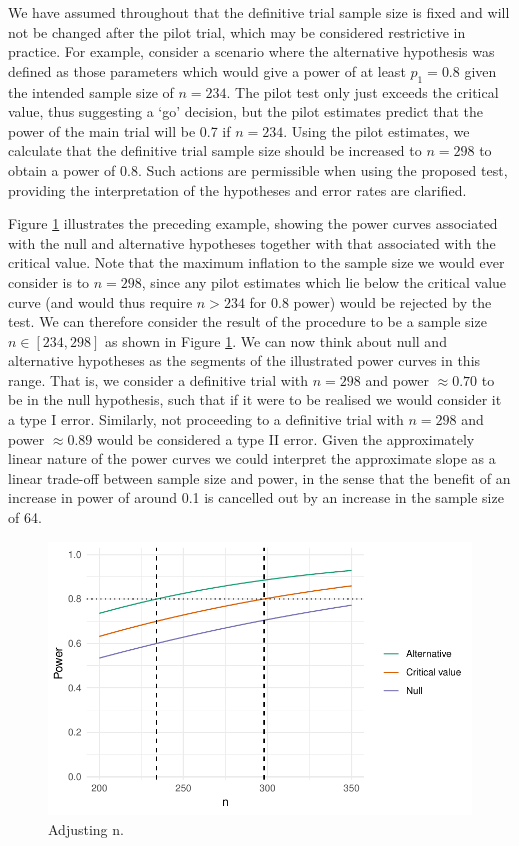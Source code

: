 \documentclass[AMA,STIX1COL]{WileyNJD-v2}
\begin{document}
We have assumed throughout that the definitive trial sample size is fixed and will not be changed after the pilot trial, which may be considered restrictive in practice. For example, consider a scenario where the alternative hypothesis was defined as those parameters which would give a power of at least $p_1 = 0.8$ given the intended sample size of $n = 234$. The pilot test only just exceeds the critical value, thus suggesting a `go' decision, but the pilot estimates predict that the power of the main trial will be 0.7 if $n = 234$. Using the pilot estimates, we calculate that the definitive trial sample size should be increased to $n = 298$ to obtain a power of 0.8. Such actions are permissible when using the proposed test, providing the interpretation of the hypotheses and error rates are clarified. 

Figure \ref{fig:adjust_n} illustrates the preceding example, showing the power curves associated with the null and alternative hypotheses together with that associated with the critical value. Note that the maximum inflation to the sample size we would ever consider is to $n=298$, since any pilot estimates which lie below the critical value curve (and would thus require $n > 234$ for 0.8 power) would be rejected by the test. We can therefore consider the result of the procedure to be a sample size $n \in [234, 298]$ as shown in Figure \ref{fig:adjust_n}. We can now think about null and alternative hypotheses as the segments of the illustrated power curves in this range. That is, we consider a definitive trial with $n = 298$ and power $\approx 0.70$ to be in the null hypothesis, such that if it were to be realised we would consider it a type I error. Similarly, not proceeding to a definitive trial with $n=298$ and power $\approx 0.89$ would be considered a type II error. Given the approximately linear nature of the power curves we could interpret the approximate slope as a linear trade-off between sample size and power, in the sense that the benefit of an increase in power of around 0.1 is cancelled out by an increase in the sample size of 64.

\begin{figure}
\centering
\includegraphics[scale=0.8]{./Figures/adjust_n.pdf}
\caption{Adjusting n.}
\label{fig:adjust_n}
\end{figure}
\end{document}
